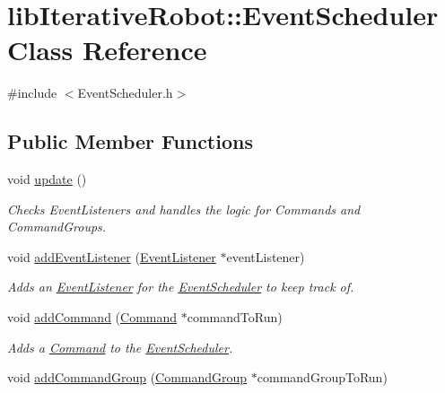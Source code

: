\hypertarget{classlib_iterative_robot_1_1_event_scheduler}{}\section{lib\+Iterative\+Robot\+::Event\+Scheduler Class Reference}
\label{classlib_iterative_robot_1_1_event_scheduler}


{\ttfamily \#include $<$Event\+Scheduler.\+h$>$}

\subsection*{Public Member Functions}
\begin{DoxyCompactItemize}
\item 
void \mbox{\hyperlink{classlib_iterative_robot_1_1_event_scheduler_a9643c8e8dd7a87a1a3419415c7cc46bc}{update}} ()
\begin{DoxyCompactList}\small\item\em Checks Event\+Listeners and handles the logic for Commands and Command\+Groups. \end{DoxyCompactList}\item 
void \mbox{\hyperlink{classlib_iterative_robot_1_1_event_scheduler_ad6e214ce9686a58eb37fb71796531b4e}{add\+Event\+Listener}} (\mbox{\hyperlink{classlib_iterative_robot_1_1_event_listener}{Event\+Listener}} $\ast$event\+Listener)
\begin{DoxyCompactList}\small\item\em Adds an \mbox{\hyperlink{classlib_iterative_robot_1_1_event_listener}{Event\+Listener}} for the \mbox{\hyperlink{classlib_iterative_robot_1_1_event_scheduler}{Event\+Scheduler}} to keep track of. \end{DoxyCompactList}\item 
void \mbox{\hyperlink{classlib_iterative_robot_1_1_event_scheduler_aac82a5f0c53789fe6170085b033efbbc}{add\+Command}} (\mbox{\hyperlink{classlib_iterative_robot_1_1_command}{Command}} $\ast$command\+To\+Run)
\begin{DoxyCompactList}\small\item\em Adds a \mbox{\hyperlink{classlib_iterative_robot_1_1_command}{Command}} to the \mbox{\hyperlink{classlib_iterative_robot_1_1_event_scheduler}{Event\+Scheduler}}. \end{DoxyCompactList}\item 
void \mbox{\hyperlink{classlib_iterative_robot_1_1_event_scheduler_a24dfdf47117ffa162f74042345f57d94}{add\+Command\+Group}} (\mbox{\hyperlink{classlib_iterative_robot_1_1_command_group}{Command\+Group}} $\ast$command\+Group\+To\+Run)

\end{DoxyCompactItemize}
